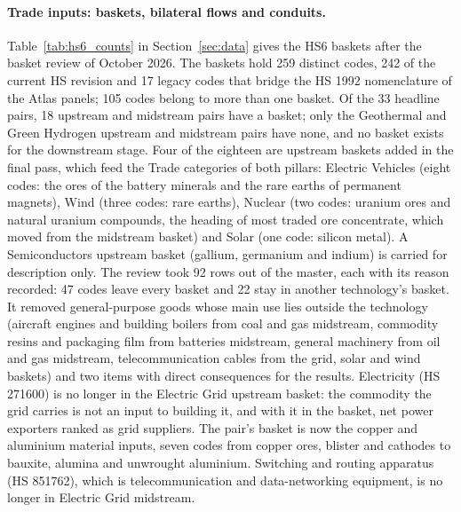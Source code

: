 

\paragraph{Trade inputs: baskets, bilateral flows and conduits.}
Table~\ref{tab:hs6_counts} in Section~\ref{sec:data} gives the HS6 baskets after the basket review
of October 2026.
The baskets hold 259 distinct codes, 242 of the current HS revision and 17 legacy codes that
bridge the HS 1992 nomenclature of the Atlas panels; 105 codes belong to more than one basket. Of
the 33 headline pairs, 18 upstream and midstream pairs have a basket; only the Geothermal and Green
Hydrogen upstream and midstream pairs have none, and no basket exists for the downstream stage.
Four of the eighteen are upstream baskets added in the final pass, which feed the Trade categories
of both pillars: Electric Vehicles (eight codes: the ores of the battery minerals and the rare
earths of permanent magnets), Wind (three codes: rare earths), Nuclear (two codes: uranium ores
and natural uranium compounds, the heading of most traded ore concentrate, which moved from the
midstream basket) and Solar (one code: silicon
metal). A Semiconductors upstream basket (gallium, germanium and indium) is carried for
description only. The review took 92 rows out of the master,
each with its reason recorded: 47 codes leave every basket and 22 stay in another technology's
basket. It removed general-purpose goods whose main use lies outside the technology (aircraft
engines and building boilers from coal and gas midstream, commodity resins and packaging film
from batteries midstream, general machinery from oil and gas midstream, telecommunication cables
from the grid, solar and wind baskets) and two items with direct consequences for the results.
Electricity (HS 271600) is no longer in the Electric Grid upstream basket: the commodity the grid
carries is not an input to building it, and with it in the basket, net power exporters ranked as
grid suppliers. The pair's basket is now the copper and aluminium material inputs, seven codes
from copper ores, blister and cathodes to bauxite, alumina and unwrought aluminium. Switching and
routing apparatus (HS 851762), which is telecommunication and data-networking equipment, is no
longer in Electric Grid midstream.

